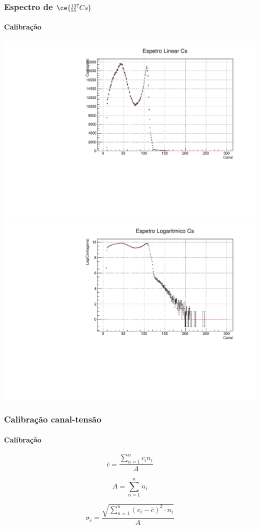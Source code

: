 \documentclass[10pt]{beamer}
\begin{document}
\begin{frame}

\frametitle{Espectro de $\ce{^{137}_{55}Cs}$}\framesubtitle{Calibração}

   \centering
   \includegraphics[scale=0.25]{esplincs.pdf}
   \includegraphics[scale=0.25]{esplogcs.pdf}

\end{frame}


\begin{frame}
\frametitle{Calibração canal-tensão}
\framesubtitle{Calibração}

\begin{equation}
\overline{c}=\frac{\sum\limits_{n=1}^n c_{i}n_{i}}{A}
\label{centroide}
\end{equation}


\begin{equation}
A=\sum\limits_{n=1}^n n_{i}
\end{equation}


\begin{equation}
\sigma_{\overline{c}}=\frac{\sqrt{\sum\limits_{n=1}^n (c_{i}-\overline{c})^2 \cdot n_{i}    }}{A}
\label{e_centroide}
\end{equation}

\end{frame}
\end{document}
